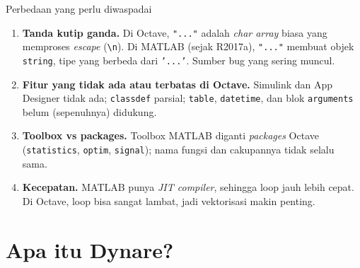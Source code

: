 \documentclass[aspectratio=169,11pt]{beamer}
\begin{document}
\begin{frame}{Perbedaan yang perlu diwaspadai}
\begin{enumerate}
  \item \textbf{Tanda kutip ganda.} Di Octave, \texttt{"..."} adalah
        \emph{char array} biasa yang memproses \emph{escape} (\texttt{\textbackslash n}).
        Di MATLAB (sejak R2017a), \texttt{"..."} membuat objek
        \texttt{string}, tipe yang berbeda dari \texttt{'...'}.
        Sumber bug yang sering muncul.
  \item \textbf{Fitur yang tidak ada atau terbatas di Octave.}
        Simulink dan App Designer tidak ada; \texttt{classdef} parsial;
        \texttt{table}, \texttt{datetime}, dan blok \texttt{arguments}
        belum (sepenuhnya) didukung.
  \item \textbf{Toolbox vs packages.} Toolbox MATLAB diganti
        \emph{packages} Octave (\texttt{statistics}, \texttt{optim},
        \texttt{signal}); nama fungsi dan cakupannya tidak selalu sama.
  \item \textbf{Kecepatan.} MATLAB punya \emph{JIT compiler}, sehingga loop
        jauh lebih cepat. Di Octave, loop bisa sangat lambat, jadi
        vektorisasi makin penting.
\end{enumerate}
\end{frame}

\section{Apa itu Dynare?}
\end{document}
